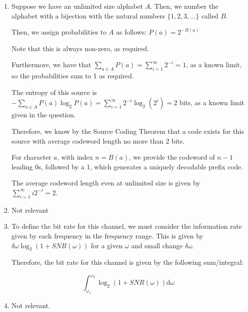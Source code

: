 


\begin{enumerate}[label=(\alph*)]
  \item
    Suppose we have an unlimited size alphabet $A$. Then, we number the alphabet with a bijection with the natural numbers $\{1,2,3,...\}$ called $B$.

    Then, we assign probabilities to $A$ as follows: $P(a) = 2^{-B(a)}$

    Note that this is always non-zero, as required.

    Furthermore, we have that $\sum_{a \in A} P(a) = \sum_{i=1}^\infty 2^{-i} = 1$, as a known limit, so the probabilities sum to 1 as required.

    The entropy of this source is $-\sum_{a \in A}P(a) \log_2 P(a) = \sum_{i=1}^\infty 2^{-i}\log_2(2^i) = 2$ bits, as a known limit given in the question.

    Therefore, we know by the Source Coding Theorem that a code exists for this source with average codeword length no more than 2 bits.

    For character $a$, with index $n = B(a)$, we provide the codeword of $n-1$ leading 0s, followed by a 1, which generates a uniquely decodable prefix code.

    The average codeword length even at unlimited size is given by $\sum_{i=1}^\infty i2^{-i} = 2$.

  \item
    Not relevant

  \item

    To define the bit rate for this channel, we must consider the information rate given by each frequency in the frequency range. This is given by $\delta \omega \log_2(1 + SNR(\omega))$ for a given $\omega$ and small change $\delta \omega$.

    Therefore, the bit rate for this channel is given by the following sum/integral:

    \[
      \int_{\omega_1}^{\omega_2} \log_2(1 + SNR(\omega)) \mathrm{d}\omega
    \] 

  \item
    Not relevant.









        
\end{enumerate}

